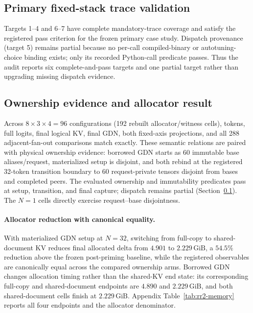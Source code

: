 \documentclass{article}
\newcommand{\gib}{\,\mathrm{GiB}}
\begin{document}
\subsection{Primary fixed-stack trace validation}
\label{sec:target-status}

Targets 1--4 and 6--7 have complete mandatory-trace coverage and satisfy the
registered pass criterion for the frozen primary case study.  Dispatch
provenance (target 5) remains partial because no per-call compiled-binary or
autotuning-choice binding exists; only its recorded Python-call predicate
passes.  Thus the audit reports six complete-and-pass targets and one partial
target rather than upgrading missing dispatch evidence.

\subsection{Ownership evidence and allocator result}

Across $8\times3\times4=96$ configurations (192 rebuilt allocator/witness
cells), tokens, full logits, final logical KV, final GDN, both fixed-axis
projections, and all 288 adjacent-fan-out comparisons match exactly.  These
semantic relations are paired with physical ownership evidence: borrowed GDN
starts as 60 immutable base aliases/request, materialized setup is disjoint,
and both rebind at the registered 32-token transition boundary to 60
request-private tensors disjoint from bases and completed peers.  The evaluated
ownership and immutability predicates pass at setup, transition, and final
capture; dispatch remains partial (Section~\ref{sec:target-status}).  The $N=1$
cells directly exercise request--base disjointness.

\paragraph{Allocator reduction with canonical equality.}
With materialized GDN setup at $N=32$, switching from full-copy to
shared-document KV reduces final allocated delta from $4.901$ to $2.229\gib$,
a $54.5\%$ reduction above the frozen post-priming baseline, while the
registered observables are canonically equal across the compared ownership
arms.  Borrowed GDN changes allocation timing
rather than the shared-KV end state: its corresponding full-copy and
shared-document endpoints are $4.890$ and $2.229\gib$, and both shared-document
cells finish at $2.229\gib$.  Appendix Table~\ref{tab:rr2-memory} reports all
four endpoints and the allocator denominator.
\end{document}
